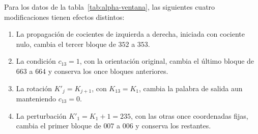 \begin{proposition}
\label{mg05:dependencias}
Para los datos de la tabla~\ref{tab:alpha-ventana}, las siguientes
cuatro modificaciones tienen efectos distintos:
\begin{enumerate}
\item La propagación de cocientes de izquierda a derecha, iniciada con
cociente nulo, cambia el tercer bloque de \(352\) a \(353\).
\item La condición \(c_{13}=1\), con la orientación original,
cambia el último bloque de \(663\) a \(664\) y conserva los once
bloques anteriores.
\item La rotación \(K'_j=K_{j+1}\), con \(K_{13}=K_1\), cambia
la palabra de salida aun manteniendo \(c_{13}=0\).
\item La perturbación \(K'_1=K_1+1=235\), con las otras once
coordenadas fijas, cambia el primer bloque de \(007\) a \(006\)
y conserva los restantes.
\end{enumerate}
\end{proposition}
